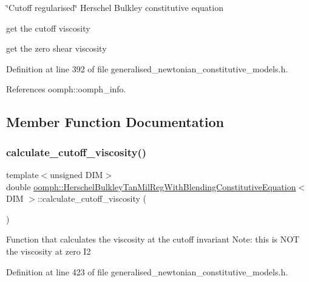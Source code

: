 \char`\"{}\+Cutoff regularised\char`\"{} Herschel Bulkley constitutive equation 

get the cutoff viscosity

get the zero shear viscosity 

Definition at line 392 of file generalised\+\_\+newtonian\+\_\+constitutive\+\_\+models.\+h.



References oomph\+::oomph\+\_\+info.



\subsection{Member Function Documentation}
\mbox{\label{classoomph_1_1HerschelBulkleyTanMilRegWithBlendingConstitutiveEquation_a505f8b8eba6c70c101087c8809953e51}} 
\subsubsection{\texorpdfstring{calculate\+\_\+cutoff\+\_\+viscosity()}{calculate\_cutoff\_viscosity()}}
{\footnotesize\ttfamily template$<$unsigned D\+IM$>$ \\
double \hyperlink{classoomph_1_1HerschelBulkleyTanMilRegWithBlendingConstitutiveEquation}{oomph\+::\+Herschel\+Bulkley\+Tan\+Mil\+Reg\+With\+Blending\+Constitutive\+Equation}$<$ D\+IM $>$\+::calculate\+\_\+cutoff\+\_\+viscosity (\begin{DoxyParamCaption}{ }\end{DoxyParamCaption})\hspace{0.3cm}{\ttfamily [inline]}}

Function that calculates the viscosity at the cutoff invariant Note\+: this is N\+OT the viscosity at zero I2 

Definition at line 423 of file generalised\+\_\+newtonian\+\_\+constitutive\+\_\+models.\+h.

